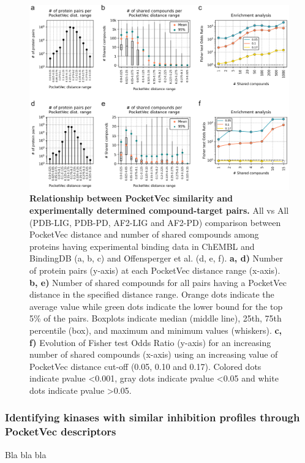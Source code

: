 \begin{figure}[H]
  \centering
  \includegraphics[width=\linewidth]{figures/PocketVec/Main/Fig6.png} 
  \caption{
    \textbf{Relationship between PocketVec similarity and experimentally determined compound-target pairs.}
    All vs All (PDB-LIG, PDB-PD, AF2-LIG and AF2-PD) comparison between PocketVec distance and number of shared compounds among proteins having experimental binding data in ChEMBL and BindingDB (a, b, c) and Offensperger et al.\cite{offensperger_large-scale_2024} (d, e, f).
    \textbf{a, d)} Number of protein pairs (y-axis) at each PocketVec distance range (x-axis).
    \textbf{b, e)} Number of shared compounds for all pairs having a PocketVec distance in the specified distance range. Orange dots indicate the average value while green dots indicate the lower bound for the top 5\% of the pairs. Boxplots indicate median (middle line), 25th, 75th percentile (box), and maximum and minimum values (whiskers). 
    \textbf{c, f)} Evolution of Fisher test Odds Ratio (y-axis) for an increasing number of shared compounds (x-axis) using an increasing value of PocketVec distance cut-off (0.05, 0.10 and 0.17). Colored dots indicate pvalue <0.001, gray dots indicate pvalue <0.05 and white dots indicate pvalue >0.05.
  }
  \label{PocketVec_Fig6}
\end{figure}


\subsubsection{Identifying kinases with similar inhibition profiles through PocketVec descriptors}
\label{PocketVec_ResultsAndDiscussion_Identifying_Kinases}


Bla bla bla


